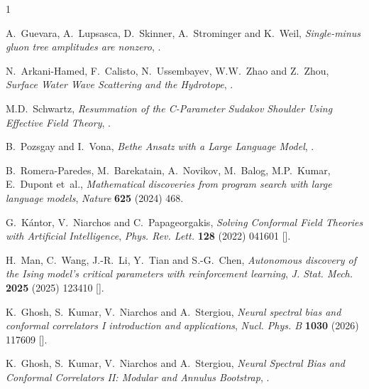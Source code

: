 \documentclass[11pt]{article}
\begin{document}
\clearpage
\providecommand{\href}[2]{#2}\begingroup\raggedright\begin{thebibliography}{1}

A.~Guevara, A.~Lupsasca, D.~Skinner, A.~Strominger and K.~Weil,
  \emph{{Single-minus gluon tree amplitudes are nonzero}},
  \href{https://arxiv.org/abs/2602.12176}{{}}.

N.~Arkani-Hamed, F.~Calisto, N.~Ussembayev, W.W.~Zhao and Z.~Zhou,
  \emph{{Surface Water Wave Scattering and the Hydrotope}},
  \href{https://arxiv.org/abs/2606.28280}{{}}.

M.D.~Schwartz, \emph{{Resummation of the C-Parameter Sudakov Shoulder Using
  Effective Field Theory}},  \href{https://arxiv.org/abs/2601.02484}{{}}.

B.~Pozsgay and I.~Vona, \emph{{Bethe Ansatz with a Large Language Model}},
  \href{https://arxiv.org/abs/2603.29932}{{}}.

B.~Romera-Paredes, M.~Barekatain, A.~Novikov, M.~Balog, M.P.~Kumar, E.~Dupont
  et~al., \emph{{Mathematical discoveries from program search with large
  language models}},
  \href{https://doi.org/10.1038/s41586-023-06924-6}{\emph{Nature} {\bfseries
  625} (2024) 468}.

G.~K{\'a}ntor, V.~Niarchos and C.~Papageorgakis, \emph{{Solving Conformal Field
  Theories with Artificial Intelligence}},
  \href{https://doi.org/10.1103/PhysRevLett.128.041601}{\emph{Phys. Rev. Lett.}
  {\bfseries 128} (2022) 041601}
  [\href{https://arxiv.org/abs/2108.08859}{{}}].

H.~Man, C.~Wang, J.-R.~Li, Y.~Tian and S.-G.~Chen, \emph{{Autonomous discovery
  of the Ising model's critical parameters with reinforcement learning}},
  \href{https://doi.org/10.1088/1742-5468/ae22ea}{\emph{J. Stat. Mech.}
  {\bfseries 2025} (2025) 123410}
  [\href{https://arxiv.org/abs/2601.05577}{{}}].

K.~Ghosh, S.~Kumar, V.~Niarchos and A.~Stergiou, \emph{{Neural spectral bias
  and conformal correlators I introduction and applications}},
  \href{https://doi.org/10.1016/j.nuclphysb.2026.117609}{\emph{Nucl. Phys. B}
  {\bfseries 1030} (2026) 117609}
  [\href{https://arxiv.org/abs/2604.18686}{{}}].

K.~Ghosh, S.~Kumar, V.~Niarchos and A.~Stergiou, \emph{{Neural Spectral Bias
  and Conformal Correlators II: Modular and Annulus Bootstrap}},
  \href{https://arxiv.org/abs/2607.24913}{{}}.

\end{thebibliography}\endgroup
\end{document}
